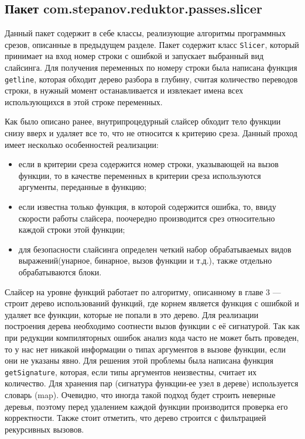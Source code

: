 \subsection{Пакет com.stepanov.reduktor.passes.slicer}
Данный пакет содержит в себе классы, реализующие алгоритмы программных срезов, описанные в предыдущем разделе. Пакет содержит класс \texttt{Slicer}, который принимает на вход номер строки с ошибкой и запускает выбранный вид слайсинга. Для получения переменных по номеру строки была написана функция \texttt{getline}, которая обходит дерево разбора в глубину, считая количество переводов строки, в нужный момент останавливается и извлекает имена всех использующихся в этой строке переменных. 

Как было описано ранее, внутрипроцедурный слайсер обходит тело функции снизу вверх и удаляет все то, что не относится к критерию среза. Данный проход имеет несколько особенностей реализации:
\begin{itemize}
	\item если в критерии среза содержится номер строки, указывающей на вызов функции, то в качестве переменных в критерии среза используются аргументы, переданные в функцию;
	\item если известна только функция, в которой содержится ошибка, то, ввиду скорости работы слайсера, поочередно производится срез относительно каждой строки этой функции;
	\item для безопасности слайсинга определен четкий набор обрабатываемых видов выражений(унарное, бинарное, вызов функции и т.д.), также отдельно обрабатываются блоки.
\end{itemize}

Слайсер на уровне функций работает по алгоритму, описанному в главе 3 --- строит дерево использований функций, где корнем является функция с ошибкой и удаляет все функции, которые не попали в это дерево. Для реализации построения дерева необходимо соотнести вызов функции с её сигнатурой. Так как при редукции компиляторных ошибок анализ кода часто не может быть проведен, то у нас нет никакой информации о типах аргументов в вызове функции, если они не указаны явно. Для решения этой проблемы была написана функция \texttt{getSignature}, которая, если типы аргументов неизвестны, считает их количество. Для хранения пар (сигнатура функции-ее узел в дереве) используется словарь (map). Очевидно, что иногда такой подход будет строить неверные деревья, поэтому перед удалением каждой функции производится проверка его корректности. Также стоит отметить, что дерево строится с фильтрацией рекурсивных вызовов.

